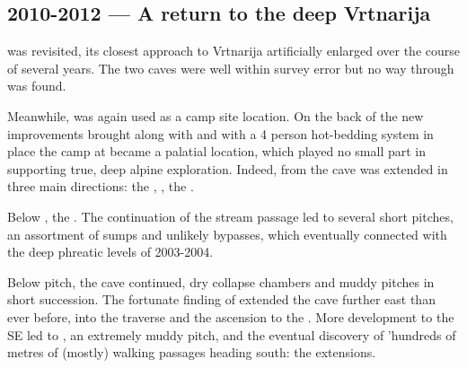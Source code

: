 \subsection{2010-2012 --- A return to the deep Vrtnarija} 
 was revisited, its closest approach to Vrtnarija artificially enlarged over the course of several years. The two caves were well within survey error but no way through was found. 

Meanwhile,  was again used as a camp site location. On the back of the new improvements brought along with  and with a 4 person hot-bedding system in place the camp at  became a palatial location, which played no small part in supporting true, deep alpine exploration. Indeed, from  the cave was extended in three main directions: the , , the .

Below , the . The continuation of the stream passage led to several short pitches, an assortment of sumps and unlikely bypasses, which eventually connected with the deep phreatic levels of 2003-2004.

Below  pitch, the cave continued, dry collapse chambers and muddy pitches in short succession. The fortunate finding of  extended the cave further east than ever before, into the  traverse and the ascension to the . More development to the SE led to , an extremely muddy pitch, and the eventual discovery of 'hundreds of metres of (mostly) walking passages heading south: the  extensions.

